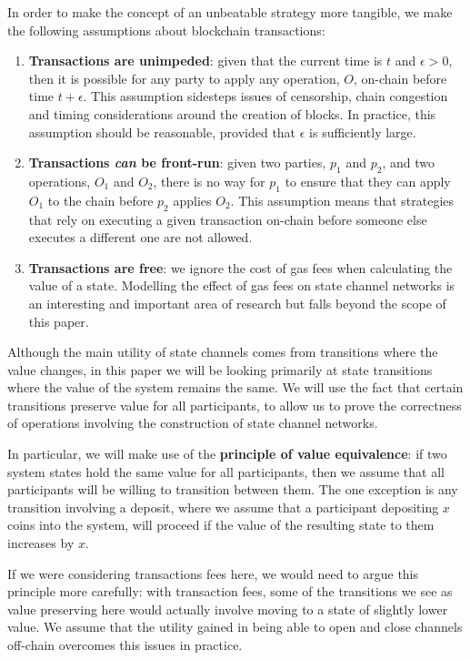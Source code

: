 \documentclass{article}
\theoremstyle{definition}
\begin{document}
In order to make the concept of an unbeatable strategy more tangible, we make the following assumptions about blockchain transactions:
\begin{enumerate}
  \item \textbf{Transactions are unimpeded}: given that the current time is $t$ and $\epsilon > 0$, then it is possible for any party to apply any operation, $O$, on-chain before time $t + \epsilon$.
  This assumption sidesteps issues of censorship, chain congestion and timing considerations around the creation of blocks.
  In practice, this assumption should be reasonable, provided that $\epsilon$ is sufficiently large.
  \item \textbf{Transactions \textit{can} be front-run}: given two parties, $p_1$ and $p_2$, and two operations, $O_1$ and $O_2$, there is no way for $p_1$ to ensure that they can apply $O_1$ to the chain before $p_2$ applies $O_2$.
  This assumption means that strategies that rely on executing a given transaction on-chain before someone else executes a different one are not allowed.
  \item \textbf{Transactions are free}: we ignore the cost of gas fees when calculating the value of a state.
  Modelling the effect of gas fees on state channel networks is an interesting and important area of research but falls beyond the scope of this paper.
\end{enumerate}

Although the main utility of state channels comes from transitions where the value changes,
in this paper we will be looking primarily at state transitions where the value of the system
remains the same.
We will use the fact that certain transitions preserve value for all participants, to allow us
to prove the correctness of operations involving the construction of state channel networks.

In particular, we will make use of the \textbf{principle of value equivalence}: if two system
states hold the same value for all participants, then we assume that all participants will
be willing to transition between them.
The one exception is any transition involving a deposit, where we assume that a participant depositing
$x$ coins into the system, will proceed if the value of the resulting state to them increases by $x$.

If we were considering transactions fees here, we would need to argue this principle more
carefully: with transaction fees, some of the transitions we see as value preserving here
would actually involve moving to a state of slightly lower value. 
We assume that the utility gained in being able to open and close channels off-chain overcomes
this issues in practice.
\end{document}
